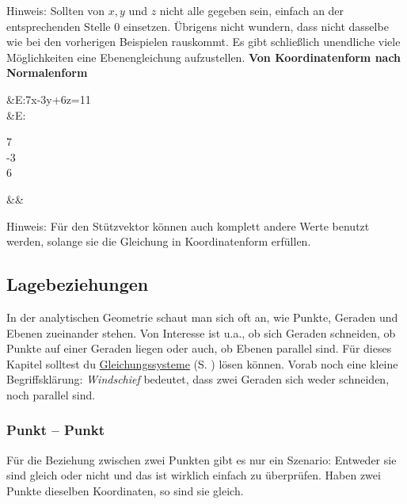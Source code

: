 \documentclass[12pt]{article}
\newcommand{\highlight}[2]{\textcolor{blue}{\hyperref[#1]{#2}} (S. \pageref{#1})}
\begin{document}
		Hinweis: Sollten von $x,y$ und $z$ nicht alle gegeben sein, einfach an der entsprechenden Stelle $0$ einsetzen. Übrigens nicht wundern, dass nicht dasselbe wie bei den vorherigen Beispielen rauskommt. Es gibt schließlich unendliche viele Möglichkeiten eine Ebenengleichung aufzustellen.\newline\newline\newline
		\textbf{Von Koordinatenform nach Normalenform}
		\begin{flalign*}
		&E:7x-3y+6z=11\\
		\Rightarrow&E:\begin{pmatrix}7\\-3\\6\end{pmatrix}\cdot{}&&
		\end{flalign*}
		Hinweis: Für den Stützvektor können auch komplett andere Werte benutzt werden, solange sie die Gleichung in Koordinatenform erfüllen.
	\subsection{Lagebeziehungen}
		In der analytischen Geometrie schaut man sich oft an, wie Punkte, Geraden und Ebenen zueinander stehen. Von Interesse ist u.a., ob sich Geraden schneiden, ob Punkte auf einer Geraden liegen oder auch, ob Ebenen parallel sind. Für dieses Kapitel solltest du \highlight{sec:gleichungssysteme}{Gleichungssysteme} lösen können. Vorab noch eine kleine Begriffsklärung: \textit{Windschief} bedeutet, dass zwei Geraden sich weder schneiden, noch parallel sind.
		\subsubsection{Punkt – Punkt}
			Für die Beziehung zwischen zwei Punkten gibt es nur ein Szenario: Entweder sie sind gleich oder nicht und das ist wirklich einfach zu überprüfen. Haben zwei Punkte dieselben Koordinaten, so sind sie gleich.
\end{document}
